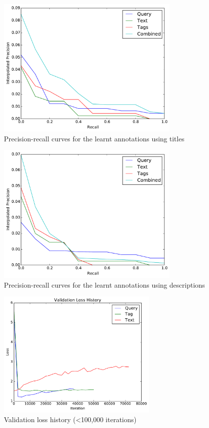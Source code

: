\begin{figure}[ht]
    \centering
    \includegraphics[width=0.8\textwidth]{graphs/auto-title}
    \caption{Precision-recall curves for the learnt annotations using titles}
    \label{fig:manual-result-title}
\end{figure}

\begin{figure}[ht]
    \centering
    \includegraphics[width=0.8\textwidth]{graphs/auto-desc}
    \caption{Precision-recall curves for the learnt annotations using descriptions}
    \label{fig:manual-result-desc}
\end{figure}

\begin{figure}
    \centering
    \includegraphics[width=0.7\textwidth]{graphs/initial-validation-loss-history}
    \caption{Validation loss history (\textless 100,000 iterations)}
    \label{fig:val-loss-1}
\end{figure}

